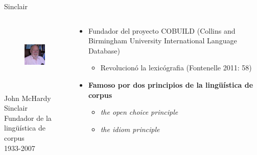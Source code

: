\documentclass{beamer}
\begin{document}
\begin{frame}{Sinclair}
	\begin{columns}
    	\begin{column}{6cm}
        	\begin{figure}
    		\includegraphics[height=3cm]{sinclair.jpg}
       		\end{figure}
            \begin{center}
			\begin{tiny}
            John McHardy Sinclair \\
			Fundador de la lingüística de corpus \\
			1933-2007\\
            \end{tiny}
			\end{center}
        \end{column}
        \begin{column}{6cm}
        	\begin{itemize}
            	\pause
                \item Fundador del proyecto COBUILD (Collins and Birmingham University International Language Database)
                \begin{itemize}
                	\pause
                    \item Revolucionó la lexicógrafia (Fontenelle 2011: 58)
                \end{itemize}
                \pause
                \item \textbf{Famoso por dos principios de la lingüística de corpus}
                \begin{itemize}
                	\pause
                    \item \textit{the open choice principle}
                    \pause
                    \item \textit{the idiom principle}
                \end{itemize}
            \end{itemize}
        \end{column}
    \end{columns}
\end{frame}
\end{document}
